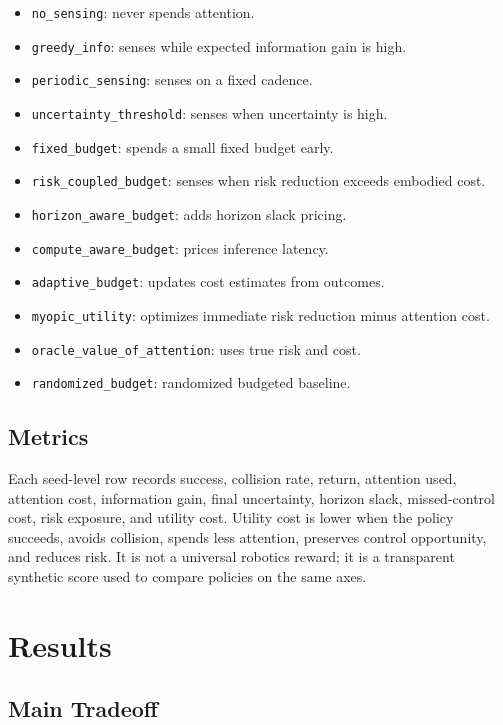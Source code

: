 \documentclass{article}
\begin{document}
\begin{itemize}
    \item \texttt{no\_sensing}: never spends attention.
    \item \texttt{greedy\_info}: senses while expected information gain is high.
    \item \texttt{periodic\_sensing}: senses on a fixed cadence.
    \item \texttt{uncertainty\_threshold}: senses when uncertainty is high.
    \item \texttt{fixed\_budget}: spends a small fixed budget early.
    \item \texttt{risk\_coupled\_budget}: senses when risk reduction exceeds
    embodied cost.
    \item \texttt{horizon\_aware\_budget}: adds horizon slack pricing.
    \item \texttt{compute\_aware\_budget}: prices inference latency.
    \item \texttt{adaptive\_budget}: updates cost estimates from outcomes.
    \item \texttt{myopic\_utility}: optimizes immediate risk reduction minus
    attention cost.
    \item \texttt{oracle\_value\_of\_attention}: uses true risk and cost.
    \item \texttt{randomized\_budget}: randomized budgeted baseline.
\end{itemize}

\subsection{Metrics}

Each seed-level row records success, collision rate, return, attention used,
attention cost, information gain, final uncertainty, horizon slack,
missed-control cost, risk exposure, and utility cost. Utility cost is lower
when the policy succeeds, avoids collision, spends less attention, preserves
control opportunity, and reduces risk. It is not a universal robotics reward;
it is a transparent synthetic score used to compare policies on the same axes.

\section{Results}

\subsection{Main Tradeoff}
\end{document}
